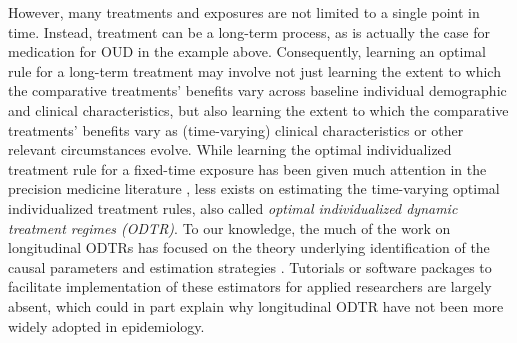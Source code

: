 \documentclass[11pt]{article}
\begin{document}
However, many treatments and exposures are not limited to a single point in time. Instead, treatment can be a long-term process, as is actually the case for medication for OUD in the example above. Consequently, learning an optimal rule for a long-term treatment may involve not just learning the extent to which the comparative treatments' benefits vary across %
baseline individual demographic and clinical characteristics, but also learning the extent to which the comparative treatments' benefits vary as (time-varying)  %
clinical characteristics or other relevant circumstances evolve. While learning the optimal individualized treatment rule for a fixed-time exposure has been given much attention in the precision medicine literature \citep[e.g.,][]{van2015targeted,MontoyavanderLaanLuedtkeSkeemCoylePetersen2022}, less exists on estimating the time-varying optimal individualized treatment rules, also called \textit{optimal individualized dynamic treatment regimes (ODTR)}. To our knowledge, the much of the work on longitudinal ODTRs has focused %
on the theory underlying identification of the causal parameters and estimation strategies \citep{luedtkeSLodtr}. %
Tutorials or software packages to facilitate implementation of these estimators for %
applied researchers are largely absent, which could in part explain why longitudinal ODTR have not been more widely adopted in epidemiology.
\end{document}
